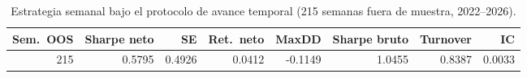 \begin{table}[htbp]
\centering
\caption{Estrategia semanal bajo el protocolo de avance temporal (215 semanas fuera de
muestra, 2022--2026).}
\label{tab:weekly-robustness}
\small
\setlength{\tabcolsep}{4pt}
\begin{tabular}{rrrrrrrr}
\toprule
Sem.\ OOS & Sharpe neto & SE & Ret.\ neto & MaxDD & Sharpe bruto & Turnover & IC \\
\midrule
215 & 0.5795 & 0.4926 & 0.0412 & -0.1149 & 1.0455 & 0.8387 & 0.0033 \\
\bottomrule
\end{tabular}
\end{table}
